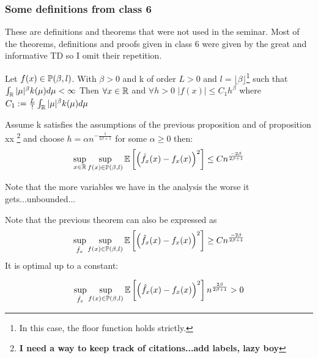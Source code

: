 \documentclass{article}
\begin{document}
\subsubsection{Some definitions from class 6}
These are definitions and theorems that were not used in the seminar. Most of the theorems, definitions and proofs given in class 6 were given by the great and informative TD so I omit their repetition. 
\begin{proposition}
    Let \(f(x)\in \mathbb{P}(\beta, l)\). With \(\beta>0\) and k of order \(L>0\) and \(l=\lfloor \beta \rfloor\)\footnote{In this case, the floor function holds strictly.} such that \(\int_{\mathbb{R}}|\mu|^{\beta} k(\mu) d\mu <\infty\) Then \(\forall x \in \mathbb{R}\) and \(\forall h>0\) \(|f(x)|\leq C_{1}h^{\beta}\) where \(C_{1}:=\frac{L}{!}\int_{\mathbb{R}}|\mu|^{\beta} k(\mu) d\mu\)
\end{proposition}

\begin{theorem}
    Assume k satisfies the assumptions of the previous proposition and of proposition xx \footnote{\textbf{I need a way to keep track of citations...add labels, lazy boy}} and choose \(h=\alpha n^{-\frac{1}{2\beta + 1}}\) for some \(\alpha \geq 0\) then: 
    \[
        \sup_{x \in \mathbb{R}} \sup_{f(x) \in \mathbb{P}(\beta , l)} \mathbb{E} \left[ \left(\hat{f}_{x}(x)-f_{x}(x)\right)^{2}\right] \leq C n^{\frac{-2\beta}{2\beta+1}} \]

    
\end{theorem}
Note that the more variables we have in the analysis the  worse it gets...unbounded...

\begin{remark}
    Note that the previous theorem can also be expressed as \[ 
    \sup_{\hat{f}_x} \sup_{f(x) \in \mathbb{P}(\beta , l)} \mathbb{E} \left[ \left(\hat{f}_{x}(x)-f_{x}(x)\right)^{2}\right] \geq C n^{\frac{-2\beta}{2\beta+1}}
    \]
    It is optimal up to a constant: 


    \[
    \sup_{\hat{f}_x} \sup_{f(x) \in \mathbb{P}(\beta , l)} \mathbb{E} \left[ \left(\hat{f}_{x}(x)-f_{x}(x)\right)^{2}\right] n^{\frac{2\beta}{2\beta+1}} > 0 
    \]
\end{remark}
\end{document}
